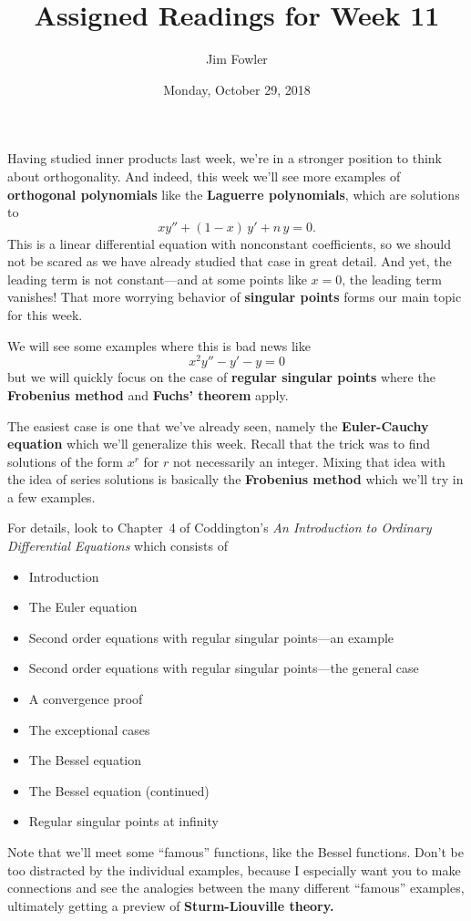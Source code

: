 \documentclass{homework}
\author{Jim Fowler}
\title{Assigned Readings for Week 11}
\date{Monday, October 29, 2018}
\begin{document}
\maketitle

Having studied inner products last week, we're in a stronger position
to think about orthogonality.  And indeed, this week we'll see more
examples of \textbf{orthogonal polynomials} like the \textbf{Laguerre
  polynomials}, which are solutions to
\[
  x y'' + (1-x) \, y' + n \, y = 0.
\]
This is a linear differential equation with nonconstant coefficients,
so we should not be scared as we have already studied that case in
great detail.  And yet, the leading term is not constant---and at some
points like $x = 0$, the leading term vanishes!  That more worrying
behavior of \textbf{singular points} forms our main topic for this
week.

We will see some examples where this is bad news like
\[
  x^2 y'' - y' - y = 0
\]
but we will quickly focus on the case of \textbf{regular singular
  points} where the \textbf{Frobenius method} and \textbf{Fuchs'
  theorem} apply.

The easiest case is one that we've already seen, namely the
\textbf{Euler-Cauchy equation} which we'll generalize this week.
Recall that the trick was to find solutions of the form $x^r$ for $r$
not necessarily an integer.  Mixing that idea with the idea of series
solutions is basically the \textbf{Frobenius method} which we'll try
in a few examples.

For details, look to Chapter~4 of Coddington's \textit{An Introduction
  to Ordinary Differential Equations} which consists of
\begin{itemize}
\item {} Introduction
\item {} The Euler equation
\item {} Second order equations with regular singular points---an example
\item {} Second order equations with regular singular points---the general case
\item {} A convergence proof
\item {} The exceptional cases
\item {} The Bessel equation
\item {} The Bessel equation (continued)
\item {} Regular singular points at infinity
\end{itemize}
Note that we'll meet some ``famous'' functions, like the Bessel
functions.  Don't be too distracted by the individual examples,
because I especially want you to make connections and see the
analogies between the many different ``famous'' examples, ultimately
getting a preview of \textbf{Sturm-Liouville theory.}
\end{document}

